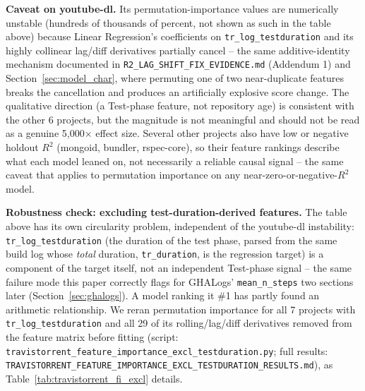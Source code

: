 \documentclass[technologies,article,submit,pdftex,moreauthors]{Definitions/mdpi}
\begin{document}
\textbf{Caveat on youtube-dl.} Its permutation-importance values are
numerically unstable (hundreds of thousands of percent, not shown as
such in the table above) because Linear Regression's coefficients on
\texttt{tr\_\allowbreak log\_\allowbreak testduration} and its highly collinear lag/diff
derivatives partially cancel -- the same additive-identity mechanism
documented in \texttt{R2\_\allowbreak LAG\_\allowbreak SHIFT\_\allowbreak FIX\_\allowbreak EVIDENCE.md} (Addendum 1) and
Section~\ref{sec:model_char}, where permuting one of two near-duplicate features breaks
the cancellation and produces an artificially explosive score change.
The qualitative direction (a Test-phase feature, not repository age) is
consistent with the other 6 projects, but the magnitude is not
meaningful and should not be read as a genuine 5,000\(\times\) effect
size. Several other projects also have low or negative holdout \(R^2\)
(mongoid, bundler, rspec-core), so their feature rankings describe what
each model leaned on, not necessarily a reliable causal signal -- the
same caveat that applies to permutation importance on any
near-zero-or-negative-\(R^2\) model.

\textbf{Robustness check: excluding test-duration-derived features.} The
table above has its own circularity problem, independent of the
youtube-dl instability: \texttt{tr\_\allowbreak log\_\allowbreak testduration} (the duration of the
test phase, parsed from the same build log whose \emph{total} duration,
\texttt{tr\_\allowbreak duration}, is the regression target) is a component of the
target itself, not an independent Test-phase signal -- the same failure
mode this paper correctly flags for GHALogs' \texttt{mean\_\allowbreak n\_\allowbreak steps} two
sections later (Section~\ref{sec:ghalogs}). A model ranking it \#1 has partly found an
arithmetic relationship. We reran permutation importance for all 7
projects with \texttt{tr\_\allowbreak log\_\allowbreak testduration} and all 29 of its
rolling/lag/diff derivatives removed from the feature matrix before
fitting (script: \texttt{travistorrent\_\allowbreak feature\_\allowbreak importance\_\allowbreak excl\_\allowbreak testduration.py};
full results: \texttt{TRAVISTORRENT\_\allowbreak FEATURE\_\allowbreak IMPORTANCE\_\allowbreak EXCL\_\allowbreak TESTDURATION\_\allowbreak RESULTS.md}), as Table~\ref{tab:travistorrent_fi_excl} details.
\end{document}
